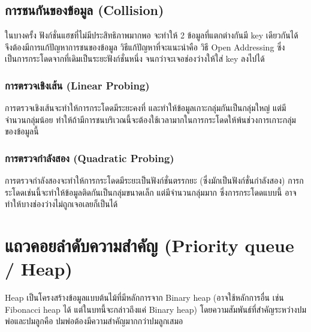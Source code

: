 \subsection{การชนกันของข้อมูล (Collision)}

ในบางครั้ง ฟังก์ชั่นแฮชที่ไม่มีประสิทธิภาพมากพอ จะทำให้ 2 ข้อมูลที่แตกต่างกันมี key เดียวกันได้ จึงต้องมีการแก้ปัญหาการชนของข้อมูล วิธีแก้ปัญหาที่จะแนะนำคือ วิธี Open Addressing ซึ่งเป็นการกระโดดจากที่เดิมเป็นระยะฟังก์ชั่นหนึ่ง จนกว่าจะเจอช่องว่างให้ใส่ key ลงไปได้

\subsubsection{การตรวจเชิงเส้น (Linear Probing)}

การตรวจเชิงเส้นจะทำให้การกระโดดมีระยะคงที่ และทำให้ข้อมูลเกาะกลุ่มกันเป็นกลุ่มใหญ่ แต่มีจำนวนกลุ่มน้อย ทำให้ถ้ามีการชนบริเวณนี้จะต้องใช้เวลามากในการกระโดดให้พ้นช่วงการเกาะกลุ่มของข้อมูลนี้

\subsubsection{การตรวจกำลังสอง (Quadratic Probing)}

การตรวจกำลังสองจะทำให้การกระโดดมีระยะเป็นฟังก์ชั่นตรรกยะ (ซึ่งมักเป็นฟังก์ชั่นกำลังสอง) การกระโดดเช่นนี้จะทำให้ข้อมูลติดกันเป็นกลุ่มขนาดเล็ก แต่มีจำนวนกลุ่มมาก ซึ่งการกระโดดแบบนี้ อาจทำให้บางช่องว่างไม่ถูกเจอเลยก็เป็นได้

\section{แถวคอยลำดับความสำคัญ (Priority queue / Heap)}

Heap เป็นโครงสร้างข้อมูลแบบต้นไม้ที่มีหลักการจาก Binary heap (อาจใช้หลักการอื่น เช่น Fibonacci heap ได้ แต่ในบทนี้จะกล่าวถึงแค่ Binary heap) โดยความสัมพันธ์ที่สำคัญระหว่างปมพ่อและปมลูกคือ ปมพ่อต้องมีความสำคัญมากกว่าปมลูกเสมอ

